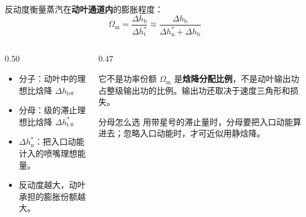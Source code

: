 \begin{frame}[t,shrink]{}
反动度衡量蒸汽在\textbf{动叶通道内}的膨胀程度：
$$
\Omega_{\mathrm{m}}
=\frac{\Delta h_{\mathrm{b}}}{\Delta h_{\mathrm{t}}^*}
\approx
\frac{\Delta h_{\mathrm{b}}}{\Delta h_{\mathrm{n}}^*+\Delta h_{\mathrm{b}}}
$$
\begin{columns}[T,onlytextwidth]
\begin{column}{0.50\textwidth}
  \begin{itemize}
    \item 分子：动叶中的理想比焓降 \(\Delta h_{\mathrm{b}}\)。
    \item 分母：级的滞止理想比焓降 \(\Delta h_{\mathrm{t}}^*\)。
    \item \(\Delta h_{\mathrm{n}}^*\)：把入口动能计入的喷嘴理想能量。
    \item 反动度越大，动叶承担的膨胀份额越大。
  \end{itemize}
\end{column}
\begin{column}{0.47\textwidth}
  \begin{amberbox}{它不是功率份额}
  \small \(\Omega_{\mathrm{m}}\) 是\textbf{焓降分配比例}，不是动叶输出功占整级输出功的比例。输出功还取决于速度三角形和损失。
  \end{amberbox}
  \vspace{0.7mm}
  \begin{keybox}{分母怎么选}
  \small 用带星号的滞止量时，分母要把入口动能算进去；忽略入口动能时，才可近似用静焓降。
  \end{keybox}
\end{column}
\end{columns}
\end{frame}

